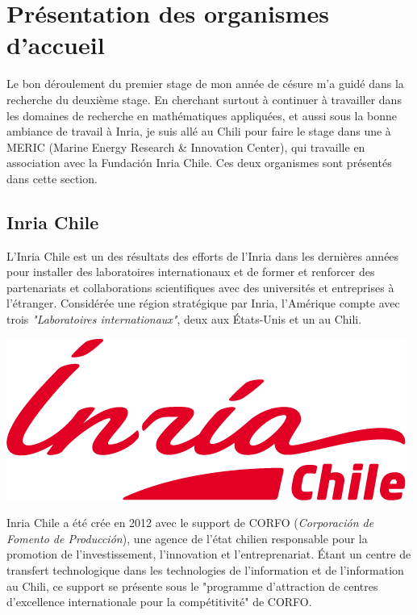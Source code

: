 \section{Présentation des organismes d'accueil}

\indent Le bon déroulement du premier stage de mon année de césure m'a guidé dans la recherche du deuxième stage. En cherchant surtout à continuer à travailler dans les domaines de recherche en mathématiques appliquées, et aussi sous la bonne ambiance de travail à Inria, je suis allé au Chili pour faire le stage dans une à MERIC (Marine Energy Research \& Innovation Center), qui travaille en association avec la Fundación Inria Chile. Ces deux organismes sont présentés dans cette section.

\subsection{Inria Chile}

\indent L'Inria Chile est un des résultats des efforts de l'Inria dans les dernières années pour installer des laboratoires internationaux et de former et renforcer des partenariats et collaborations scientifiques avec des universités et entreprises à l'étranger. Considérée une région stratégique par Inria, l'Amérique compte avec trois \emph{"Laboratoires internationaux"}, deux aux États-Unis et un au Chili.

\indent

\begingroup
\centering
\includegraphics[scale=.3]{figures/logos/Inria-Chile.png}
\endgroup

\indent

\indent Inria Chile a été crée en 2012 avec le support de CORFO (\emph{Corporación de Fomento de Producción}), une agence de l'état chilien responsable pour la promotion de l'investissement, l'innovation et l'entreprenariat. Étant un centre de transfert technologique dans les technologies de l'information et de  l'information au Chili, ce support se présente sous le "programme d'attraction de centres d'excellence internationale pour la compétitivité" de CORFO.

